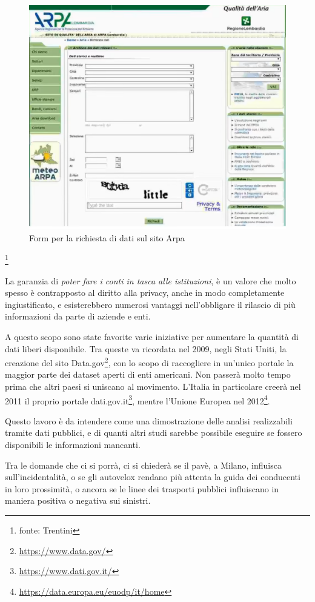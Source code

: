 \documentclass[a4paper,12pt]{report}
\newcommand{\quotestyle}[1]{\textit{#1}}
\newcommand{\skipline}{\vspace{0.2in}}
\begin{document}
\begin{figure}
    \hfill\includegraphics[width=0.7\linewidth]{img/arpa.png}\hspace*{\fill}
    \caption{Form per la richiesta di dati sul sito Arpa}
\end{figure}
\footnote{fonte: Trentini}

La garanzia di \quotestyle{poter fare i conti in tasca alle istituzioni}, è un 
valore che molto spesso è contrapposto al diritto alla privacy, anche in 
modo completamente ingiustificato, e esisterebbero numerosi vantaggi nell'obbligare 
il rilascio di più informazioni da parte di aziende e enti. 

A questo scopo sono state favorite varie iniziative per aumentare la quantità di 
dati liberi disponibile. 
Tra queste va ricordata nel 2009, negli Stati Uniti, la creazione del sito 
Data.gov\footnote{\url{https://www.data.gov/}}, 
con lo scopo di raccogliere in un'unico portale la maggior parte dei dataset 
aperti di enti americani. 
Non passerà molto tempo prima che altri paesi si uniscano al movimento. 
L'Italia in particolare creerà nel 2011 il proprio portale 
dati.gov.it\footnote{\url{https://www.dati.gov.it/}}, mentre l'Unione Europea nel 
2012\footnote{\url{https://data.europa.eu/euodp/it/home}}.

\skipline
Questo lavoro è da intendere come una dimostrazione delle analisi realizzabili 
tramite dati pubblici, e di quanti altri studi sarebbe possibile eseguire se fossero 
disponibili le informazioni mancanti.

Tra le domande che ci si porrà, ci si chiederà se il pavè, a Milano, 
influisca sull'incidentalità, o se gli autovelox rendano più attenta 
la guida dei conducenti in loro prossimità, o ancora se le linee dei trasporti pubblici 
influiscano in maniera positiva o negativa sui sinistri.
\end{document}
